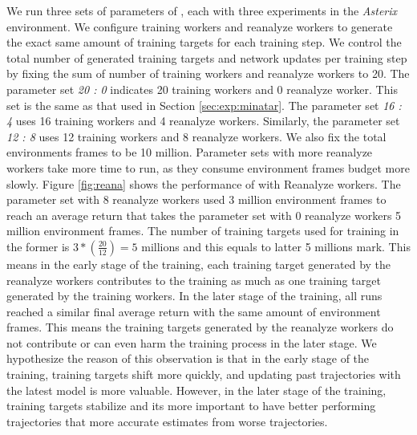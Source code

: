 We run three sets of parameters of \moozi, each with three experiments in the \textit{Asterix} environment.
We configure training workers and reanalyze workers to generate the exact same amount of training targets for each training step.
We control the total number of generated training targets and network updates per training step by fixing the sum of number of training workers and reanalyze workers to 20.
The parameter set \textit{20 : 0} indicates 20 training workers and 0 reanalyze worker.
This set is the same as that used in Section \ref{sec:exp:minatar}.
The parameter set \textit{16 : 4} uses 16 training workers and 4 reanalyze workers.
Similarly, the parameter set \textit{12 : 8} uses 12 training workers and 8 reanalyze workers.
We also fix the total environments frames to be 10 million.
Parameter sets with more reanalyze workers take more time to run, as they consume environment frames budget more slowly.
Figure \ref{fig:reana} shows the performance of \moozi with Reanalyze workers.
The parameter set with 8 reanalyze workers used 3 million environment frames to reach an average return that takes the parameter set with 0 reanalyze workers 5 million environment frames.
The number of training targets used for training in the former is $3 * (\frac{20}{12}) = 5$ millions and this equals to latter 5 millions mark.
This means in the early stage of the training, each training target generated by the reanalyze workers contributes to the training as much as one training target generated by the training workers.
In the later stage of the training, all runs reached a similar final average return with the same amount of environment frames.
This means the training targets generated by the reanalyze workers do not contribute or can even harm the training process in the later stage.
We hypothesize the reason of this observation is that in the early stage of the training, training targets shift more quickly, and updating past trajectories with the latest model is more valuable.
However, in the later stage of the training, training targets stabilize and its more important to have better performing trajectories that more accurate estimates from worse trajectories.


